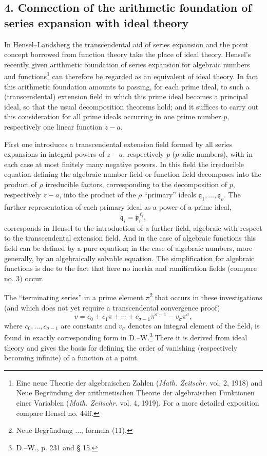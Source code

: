 \documentclass[11pt]{article}
\providecommand{\frp}{\mathfrak p}
\begin{document}
\subsection*{4. Connection of the arithmetic foundation of series expansion with ideal theory}
In Hensel--Landsberg the transcendental aid of series expansion and the point concept borrowed from function theory take the place of ideal theory. Hensel's recently given arithmetic foundation of series expansion for algebraic numbers and functions\footnote{Eine neue Theorie der algebraischen Zahlen (\emph{Math. Zeitschr.} vol. 2, 1918) and Neue Begründung der arithmetischen Theorie der algebraischen Funktionen einer Variablen (\emph{Math. Zeitschr.} vol. 4, 1919). For a more detailed exposition compare Hensel no. 44ff.} can therefore be regarded as an equivalent of ideal theory. In fact this arithmetic foundation amounts to passing, for each prime ideal, to such a (transcendental) extension field in which this prime ideal becomes a principal ideal, so that the usual decomposition theorems hold; and it suffices to carry out this consideration for all prime ideals occurring in one prime number \(p\), respectively one linear function \(z-a\).

First one introduces a transcendental extension field formed by all series expansions in integral powers of \(z-a\), respectively \(p\) (\(p\)-adic numbers), with in each case at most finitely many negative powers. In this field the irreducible equation defining the algebraic number field or function field decomposes into the product of \(\rho\) irreducible factors, corresponding to the decomposition of \(p\), respectively \(z-a\), into the product of the \(\rho\) ``primary'' ideals \(\mathfrak q_1,\ldots,\mathfrak q_\rho\). The further representation of each primary ideal as a power of a prime ideal,
\[
\mathfrak q_i=\frp_i^{\,\ell_i},
\]
corresponds in Hensel to the introduction of a further field, algebraic with respect to the transcendental extension field. And in the case of algebraic functions this field can be defined by a pure equation; in the case of algebraic numbers, more generally, by an algebraically solvable equation. The simplification for algebraic functions is due to the fact that here no inertia and ramification fields (compare no. 3) occur.

The ``terminating series'' in a prime element \(\pi\)\footnote{Neue Begründung \(\ldots\), formula (11).} that occurs in these investigations (and which does not yet require a transcendental convergence proof)
\[
v=c_0+c_1\pi+\cdots+c_{\sigma-1}\pi^{\sigma-1}-v_\sigma\pi^\sigma,
\]
where \(c_0,\ldots,c_{\sigma-1}\) are constants and \(v_\sigma\) denotes an integral element of the field, is found in exactly corresponding form in D.--W.\footnote{D.--W., p. 231 and § 15.} There it is derived from ideal theory and gives the basis for defining the order of vanishing (respectively becoming infinite) of a function at a point.
\end{document}

